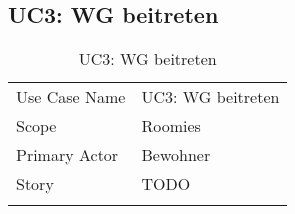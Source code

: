 \subsection{UC3: WG beitreten}
\begin{table}[H]
	\tablestyle
	\tablealtcolored
	\begin{tabularx}{\textwidth}{lX}
		\tablebody
			Use Case Name &
			UC3: WG beitreten
			\tabularnewline
			Scope &
			Roomies
			\tabularnewline
			Primary Actor &
			Bewohner
			\tabularnewline
			Story &
			TODO
			\tabularnewline
		\tableend
	\end{tabularx}
	\caption{UC3: WG beitreten}
\end{table}


